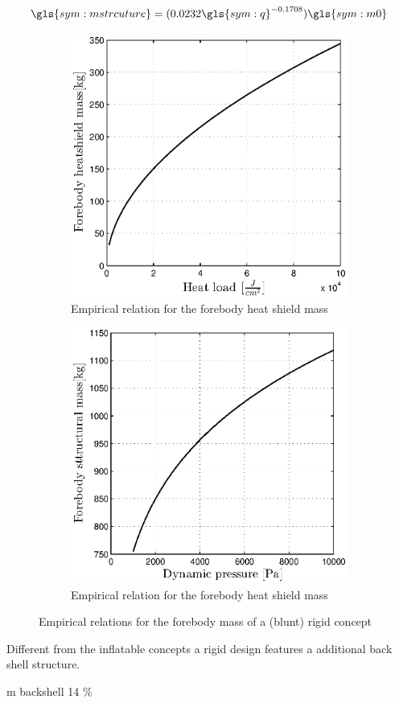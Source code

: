 \begin{equation}
\gls{sym:mstrcuture} = (0.0232 \gls{sym:q} ^{-0.1708} ) \gls{sym:m0}
\label{eq:m_structure}
\end{equation}

\begin{figure}[h]
	\centering
	\begin{subfigure}[b]{0.49\textwidth}
	\centering
	\includegraphics[width=1.0\textwidth]{Figure/rigidheat.eps}
	\caption{Empirical relation for the forebody heat shield mass} 
	\label{rigidheat}
	\end{subfigure}
	\begin{subfigure}[b]{0.49\textwidth}
	\centering
	\includegraphics[width=1.0\textwidth]{Figure/rigidstruct.eps}
	\caption{Empirical relation for the forebody heat shield mass} 
	\label{fig:rigidstruct}
	\end{subfigure}
	\caption{Empirical relations for the forebody mass of a (blunt) rigid concept}
	\label{fig:rigid}
\end{figure}

Different from the inflatable concepts a rigid design features a additional back shell structure. 

m backshell 14 \%